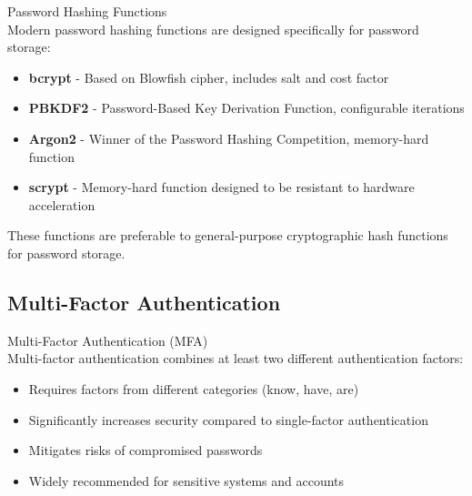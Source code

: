 \begin{theorem}{Password Hashing Functions}\\
Modern password hashing functions are designed specifically for password storage:
\begin{itemize}
    \item \textbf{bcrypt} - Based on Blowfish cipher, includes salt and cost factor
    \item \textbf{PBKDF2} - Password-Based Key Derivation Function, configurable iterations
    \item \textbf{Argon2} - Winner of the Password Hashing Competition, memory-hard function
    \item \textbf{scrypt} - Memory-hard function designed to be resistant to hardware acceleration
\end{itemize}
These functions are preferable to general-purpose cryptographic hash functions for password storage.
\end{theorem}


\subsection{Multi-Factor Authentication}

\begin{definition}{Multi-Factor Authentication (MFA)}\\
Multi-factor authentication combines at least two different authentication factors:
\begin{itemize}
    \item Requires factors from different categories (know, have, are)
    \item Significantly increases security compared to single-factor authentication
    \item Mitigates risks of compromised passwords
    \item Widely recommended for sensitive systems and accounts
\end{itemize}
\end{definition}

